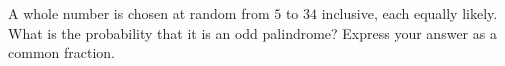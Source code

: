 A whole number is chosen at random from $5$ to $34$ inclusive, each equally likely. What is the probability that it is an odd palindrome? Express your answer as a common fraction.
